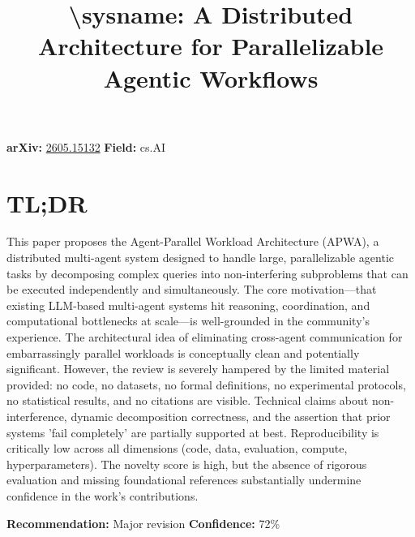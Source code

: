 \documentclass[11pt]{article}
\title{\textbackslash{}sysname: A Distributed Architecture for Parallelizable Agentic Workflows}
\date{}
\begin{document}
\maketitle

\noindent\textbf{arXiv:} \href{https://arxiv.org/abs/2605.15132}{2605.15132} \quad \textbf{Field:} cs.AI\\

\section*{TL;DR}
This paper proposes the Agent-Parallel Workload Architecture (APWA), a distributed multi-agent system designed to handle large, parallelizable agentic tasks by decomposing complex queries into non-interfering subproblems that can be executed independently and simultaneously. The core motivation—that existing LLM-based multi-agent systems hit reasoning, coordination, and computational bottlenecks at scale—is well-grounded in the community's experience. The architectural idea of eliminating cross-agent communication for embarrassingly parallel workloads is conceptually clean and potentially significant. However, the review is severely hampered by the limited material provided: no code, no datasets, no formal definitions, no experimental protocols, no statistical results, and no citations are visible. Technical claims about non-interference, dynamic decomposition correctness, and the assertion that prior systems 'fail completely' are partially supported at best. Reproducibility is critically low across all dimensions (code, data, evaluation, compute, hyperparameters). The novelty score is high, but the absence of rigorous evaluation and missing foundational references substantially undermine confidence in the work's contributions.

\textbf{Recommendation:} Major revision \quad \textbf{Confidence:} 72\%\\
\end{document}
